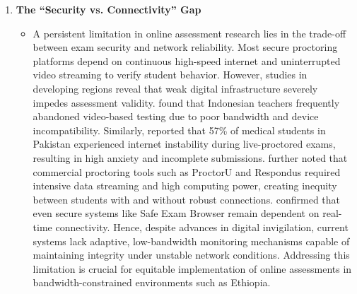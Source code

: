 \begin{enumerate}
    \item \textbf{The ``Security vs. Connectivity” Gap} 
        \begin{itemize}
            \item A persistent limitation in online assessment research lies in the trade-off between exam security and network reliability. Most secure proctoring platforms depend on continuous high-speed internet and uninterrupted video streaming to verify student behavior. However, studies in developing regions reveal that weak digital infrastructure severely impedes assessment validity. \citet{Kurniati2023} found that Indonesian teachers frequently abandoned video-based testing due to poor bandwidth and device incompatibility. Similarly, \citet{Ali2025} reported that 57\% of medical students in Pakistan experienced internet instability during live-proctored exams, resulting in high anxiety and incomplete submissions. \citet{Hussein2020} further noted that commercial proctoring tools such as ProctorU and Respondus required intensive data streaming and high computing power, creating inequity between students with and without robust connections. \citet{Topuz2022} confirmed that even secure systems like Safe Exam Browser remain dependent on real-time connectivity. Hence, despite advances in digital invigilation, current systems lack adaptive, low-bandwidth monitoring mechanisms capable of maintaining integrity under unstable network conditions. Addressing this limitation is crucial for equitable implementation of online assessments in bandwidth-constrained environments such as Ethiopia.
        \end{itemize}
    


\end{enumerate}
